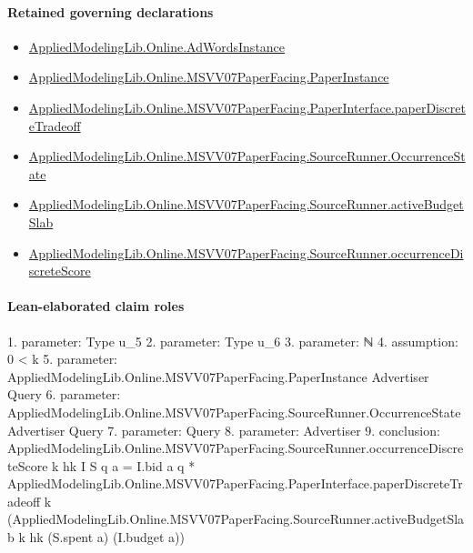 \documentclass[10pt]{article}
\begin{document}
\paragraph{Retained governing declarations}
\begin{itemize}\raggedright
\item \hyperlink{governing-declaration-e5ce49672bf26ab1}{Applied\allowbreak{}Modeling\allowbreak{}Lib.\allowbreak{}Online.\allowbreak{}Ad\allowbreak{}Words\allowbreak{}Instance}
\item \hyperlink{governing-declaration-11907576ec71eeb5}{Applied\allowbreak{}Modeling\allowbreak{}Lib.\allowbreak{}Online.\allowbreak{}MSVV07\allowbreak{}Paper\allowbreak{}Facing.\allowbreak{}Paper\allowbreak{}Instance}
\item \hyperlink{governing-declaration-396ea3a99753fcc5}{Applied\allowbreak{}Modeling\allowbreak{}Lib.\allowbreak{}Online.\allowbreak{}MSVV07\allowbreak{}Paper\allowbreak{}Facing.\allowbreak{}Paper\allowbreak{}Interface.\allowbreak{}paper\allowbreak{}Discrete\allowbreak{}Tradeoff}
\item \hyperlink{governing-declaration-2eff7815f49c1d41}{Applied\allowbreak{}Modeling\allowbreak{}Lib.\allowbreak{}Online.\allowbreak{}MSVV07\allowbreak{}Paper\allowbreak{}Facing.\allowbreak{}Source\allowbreak{}Runner.\allowbreak{}Occurrence\allowbreak{}State}
\item \hyperlink{paper-prerequisite-84b93a2351446dd2}{Applied\allowbreak{}Modeling\allowbreak{}Lib.\allowbreak{}Online.\allowbreak{}MSVV07\allowbreak{}Paper\allowbreak{}Facing.\allowbreak{}Source\allowbreak{}Runner.\allowbreak{}active\allowbreak{}Budget\allowbreak{}Slab}
\item \hyperlink{governing-declaration-2d753caf9af38bde}{Applied\allowbreak{}Modeling\allowbreak{}Lib.\allowbreak{}Online.\allowbreak{}MSVV07\allowbreak{}Paper\allowbreak{}Facing.\allowbreak{}Source\allowbreak{}Runner.\allowbreak{}occurrence\allowbreak{}Discrete\allowbreak{}Score}
\end{itemize}
\paragraph{Lean-elaborated claim roles}\begin{ReviewVerbatim}
1. parameter: Type u_5
2. parameter: Type u_6
3. parameter: ℕ
4. assumption: 0 < k
5. parameter: AppliedModelingLib.Online.MSVV07PaperFacing.PaperInstance Advertiser Query
6. parameter: AppliedModelingLib.Online.MSVV07PaperFacing.SourceRunner.OccurrenceState Advertiser Query
7. parameter: Query
8. parameter: Advertiser
9. conclusion: AppliedModelingLib.Online.MSVV07PaperFacing.SourceRunner.occurrenceDiscreteScore k hk I S q a =
  I.bid a q *
    AppliedModelingLib.Online.MSVV07PaperFacing.PaperInterface.paperDiscreteTradeoff k
      (AppliedModelingLib.Online.MSVV07PaperFacing.SourceRunner.activeBudgetSlab k hk (S.spent a) (I.budget a))
\end{ReviewVerbatim}
\end{document}
